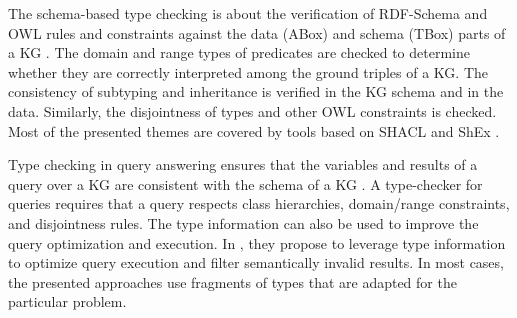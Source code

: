 \documentclass[runningheads]{llncs}
\newcommand{\memo}[1]{}
\newcommand{\notes}[1]{\noindent\begin{small}-- \emph{#1}\hfill\break\end{small}}
\begin{document}
The schema-based type checking is about the verification of RDF-Schema
\cite{rdfschema12} and OWL \cite{owl2} rules and constraints against
the data (ABox) and schema (TBox) parts of a KG
\cite{Baader2002,Horrocks2003,OWL2Spec2012}. The domain and range
types of predicates are checked to determine whether they are correctly interpreted
among the ground triples of a KG. The consistency of subtyping and
inheritance is verified in the KG schema and in the data. Similarly,
the disjointness of types and other OWL constraints is
checked. Most of the presented themes are covered by tools based on
SHACL \cite{shacl2017} and ShEx \cite{shex2015}.

Type checking in query answering ensures that the variables and
results of a query over a KG are consistent with the schema of a KG
\cite{Zhao2017,Zhang2019}. A type-checker for queries requires that a
query respects class hierarchies, domain/range constraints, and
disjointness rules. The type information can also be used to improve
the query optimization and execution. In \cite{Kollia2013}, they
propose to leverage type information to optimize query execution and
filter semantically invalid results. In most cases, the presented
approaches use fragments of types that are adapted for the particular
problem.


\memo{
\notes{Comparing typing relation in an OO model with a KG \cite{Pierce2002}.}
\notes{The values from KGs have similar structure to the values of object-oriented models.}
\notes{However, the predicates of a KG are more expressive than the data members of the classes.}
\notes{Similarly, the record types form a lattice under subtype relationship with least upper bound and greatest lower bound based on sets of record attributes.}

\notes{Include the differences between Pierce's (classical) sub-typing view of stored sub-class relationships among classes and the approach taken in this paper}
\notes{Pierce treats classes as generators of objects that inherit methods and data members from its super-class.}
\notes{The methods are inherited by copying the definitions in each subclass and then explicitely calling the method in the superclass.}
\notes{List the differences: classes are identifiers, there is a sub-class relationship included in a sub-typing relationship.}}
\end{document}
